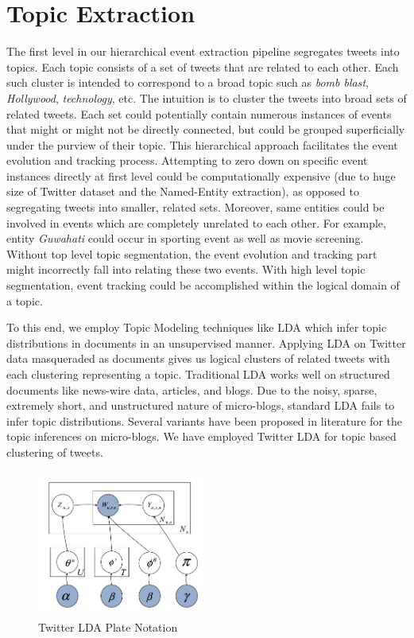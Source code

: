 \section{Topic Extraction}
The first level in our hierarchical event extraction pipeline segregates tweets into topics. Each topic consists of a set of tweets that are related to each other. Each such cluster is intended to correspond to a broad topic such as \textit{bomb blast}, \textit{Hollywood}, \textit{technology}, etc. The intuition is to cluster the tweets into broad sets of related tweets. Each set could potentially contain numerous instances of events that might or might not be directly connected, but could be grouped superficially under the purview of their topic. This hierarchical approach facilitates the event evolution and tracking process. Attempting to zero down on specific event instances directly at first level could be computationally expensive (due to huge size of Twitter dataset and the Named-Entity extraction), as opposed to segregating tweets into smaller, related sets. Moreover, same entities could be involved in events which are completely unrelated to each other. For example, entity \textit{Guwahati} could occur in sporting event as well as movie screening. Without top level topic segmentation, the event evolution and tracking part might incorrectly fall into relating these two events. With high level topic segmentation, event tracking could be accomplished within the logical domain of a topic.

To this end, we employ Topic Modeling techniques like LDA which infer topic distributions in documents in an unsupervised manner. Applying LDA on Twitter data masqueraded as documents gives us logical clusters of related tweets with each clustering representing a topic. Traditional LDA works well on structured documents like news-wire data, articles, and blogs. Due to the noisy, sparse, extremely short, and unstructured nature of micro-blogs, standard LDA fails to infer topic distributions. Several variants have been proposed in literature for the topic inferences on micro-blogs. We have employed Twitter LDA \cite{zhao2011comparing} for topic based clustering of tweets.

\begin{figure}
 \centering
 \includegraphics[width=0.5\textwidth]{twitter-lda}
 \caption{Twitter LDA Plate Notation}
 \label{fig:plate}
\end{figure}

